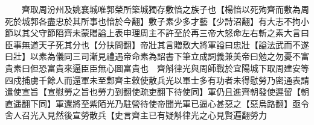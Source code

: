 　　齊取周汾州及姚襄城唯郭榮所築城獨存敷愔之族子也【楊愔以死殉齊而敷為周死於城郭各盡忠於其所事也愔於今翻】敷子素少多才藝【少詩沼翻】有大志不拘小節以其父守節䧟齊未蒙贈謚上表申理周主不許至於再三帝大怒命左右斬之素大言曰臣事無道天子死其分也【分扶問翻】帝壯其言贈敷大將軍謚曰忠壯【謚法武而不遂曰壯】以素為儀同三司漸見禮遇帝命素為詔書下筆立成詞義兼美帝曰勉之勿憂不富貴素曰但恐富貴來逼臣臣無心圖富貴也　齊斛律光與周師戰於宜陽城下取周建安等四戍捕虜千餘人而還軍未至鄴齊主敕使散兵光以軍士多有功者未得慰勞乃密通表請遣使宣旨【宣慰勞之旨也勞力到翻使疏吏翻下待使同】軍仍且進齊朝發使遲留【朝直遥翻下同】軍還將至紫陌光乃駐營待使帝聞光軍已逼心甚惡之【惡烏路翻】亟令舍人召光入見然後宣勞散兵【史言齊主已有疑斛律光之心見賢遍翻勞力